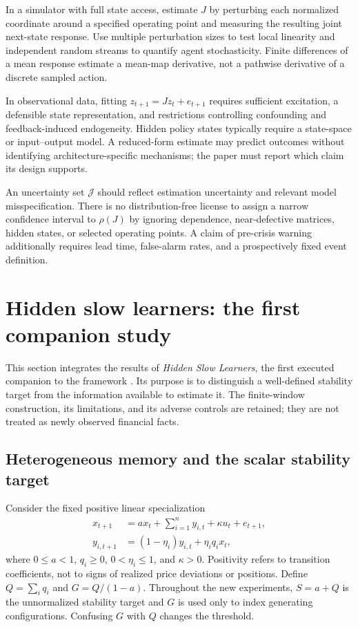 \documentclass[11pt,a4paper]{article}
\theoremstyle{definition}
\theoremstyle{remark}
\begin{document}
In a simulator with full state access, estimate $J$ by perturbing each normalized coordinate around a specified operating point and measuring the resulting joint next-state response. Use multiple perturbation sizes to test local linearity and independent random streams to quantify agent stochasticity. Finite differences of a mean response estimate a mean-map derivative, not a pathwise derivative of a discrete sampled action.

In observational data, fitting $z_{t+1}=Jz_t+e_{t+1}$ requires sufficient excitation, a defensible state representation, and restrictions controlling confounding and feedback-induced endogeneity. Hidden policy states typically require a state-space or input--output model. A reduced-form estimate may predict outcomes without identifying architecture-specific mechanisms; the paper must report which claim its design supports.

An uncertainty set $\mathcal J$ should reflect estimation uncertainty and relevant model misspecification. There is no distribution-free license to assign a narrow confidence interval to $\rho(J)$ by ignoring dependence, near-defective matrices, hidden states, or selected operating points. A claim of pre-crisis warning additionally requires lead time, false-alarm rates, and a prospectively fixed event definition.

\section{Hidden slow learners: the first companion study}
\label{sec:integrated_hidden}
This section integrates the results of \emph{Hidden Slow Learners}, the first executed companion to the framework \citep{legacy_hidden}. Its purpose is to distinguish a well-defined stability target from the information available to estimate it. The finite-window construction, its limitations, and its adverse controls are retained; they are not treated as newly observed financial facts.

\subsection{Heterogeneous memory and the scalar stability target}
Consider the fixed positive linear specialization
\begin{align}
 x_{t+1}&=a x_t+\sum_{i=1}^n y_{i,t}+\kappa u_t+e_{t+1},\\
 y_{i,t+1}&=(1-\eta_i)y_{i,t}+\eta_i q_i x_t,
 \label{eq:heterogeneous}
\end{align}
where $0\le a<1$, $q_i\ge0$, $0<\eta_i\le1$, and $\kappa>0$. Positivity refers to transition coefficients, not to signs of realized price deviations or positions. Define $Q=\sum_iq_i$ and $G=Q/(1-a)$. Throughout the new experiments, $S=a+Q$ is the unnormalized stability target and $G$ is used only to index generating configurations. Confusing $G$ with $Q$ changes the threshold.
\end{document}

